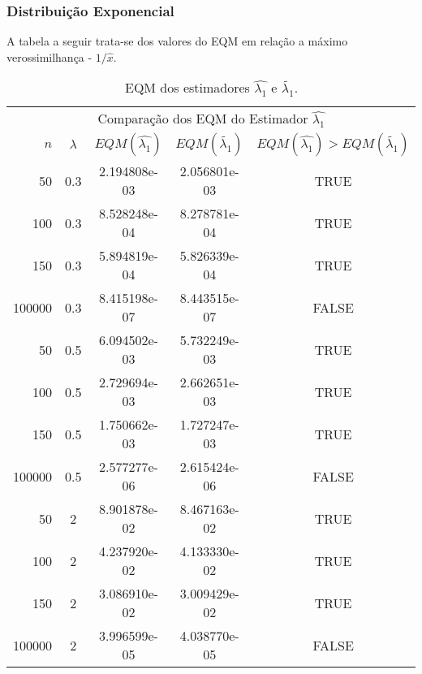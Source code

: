 \begin{frame}
\frametitle{Distribuição Exponencial}
A tabela a seguir trata-se dos valores do EQM em relação a máximo verossimilhança - $1/\hat{x}$.

\begin{table}[H]
\caption{EQM dos estimadores $\hat{\lambda_{1}}$ e $\tilde{\lambda_{1}}$.}
\label{tab:p1EQM}
\tiny
\centering
\begin{tabular}{rcccc}
\toprule
\multicolumn{5}{c}{Comparação dos EQM do Estimador $\hat{\lambda_{1}}$}\\
$n$ & $\lambda$ & $EQM(\hat{\lambda_{1}})$ & $EQM(\tilde{\lambda_{1}})$ & $EQM(\hat{\lambda_{1}})>EQM(\tilde{\lambda_{1}})$ \\
\midrule
50 & 0.3 & 2.194808e-03 & 2.056801e-03  & TRUE \\
100 & 0.3 & 8.528248e-04 & 8.278781e-04 & TRUE \\
150 & 0.3 & 5.894819e-04 & 5.826339e-04 & TRUE \\
100000 & 0.3 & 8.415198e-07 & 8.443515e-07 & FALSE \\
\midrule
50 & 0.5 & 6.094502e-03 & 5.732249e-03  & TRUE \\
100 & 0.5 &  2.729694e-03 & 2.662651e-03 & TRUE \\
150 & 0.5 &  1.750662e-03  & 1.727247e-03 & TRUE\\
100000 & 0.5 & 2.577277e-06 & 2.615424e-06 & FALSE \\
\midrule
50 & 2 & 8.901878e-02 &  8.467163e-02 & TRUE \\
100 & 2 & 4.237920e-02 &  4.133330e-02 & TRUE \\
150 & 2 & 3.086910e-02 & 3.009429e-02 & TRUE \\
100000 & 2 & 3.996599e-05 & 4.038770e-05 & FALSE \\
\bottomrule
\end{tabular}
\end{table}
\end{frame}


